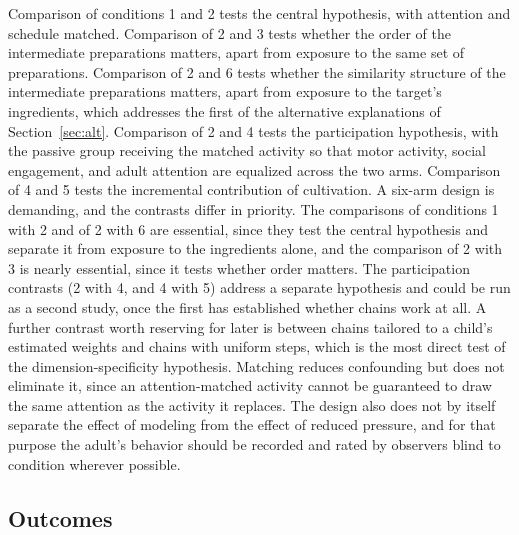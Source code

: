 \documentclass[11pt]{article}
\theoremstyle{remark}
\begin{document}
Comparison of conditions 1 and 2 tests the central hypothesis, with attention and schedule matched. Comparison of 2 and 3 tests whether the order of the intermediate preparations matters, apart from exposure to the same set of preparations. Comparison of 2 and 6 tests whether the similarity structure of the intermediate preparations matters, apart from exposure to the target's ingredients, which addresses the first of the alternative explanations of Section~\ref{sec:alt}. Comparison of 2 and 4 tests the participation hypothesis, with the passive group receiving the matched activity so that motor activity, social engagement, and adult attention are equalized across the two arms. Comparison of 4 and 5 tests the incremental contribution of cultivation. A six-arm design is demanding, and the contrasts differ in priority. The comparisons of conditions 1 with 2 and of 2 with 6 are essential, since they test the central hypothesis and separate it from exposure to the ingredients alone, and the comparison of 2 with 3 is nearly essential, since it tests whether order matters. The participation contrasts (2 with 4, and 4 with 5) address a separate hypothesis and could be run as a second study, once the first has established whether chains work at all. A further contrast worth reserving for later is between chains tailored to a child's estimated weights and chains with uniform steps, which is the most direct test of the dimension-specificity hypothesis. Matching reduces confounding but does not eliminate it, since an attention-matched activity cannot be guaranteed to draw the same attention as the activity it replaces. The design also does not by itself separate the effect of modeling from the effect of reduced pressure, and for that purpose the adult's behavior should be recorded and rated by observers blind to condition wherever possible.

\subsection{Outcomes}
\end{document}

